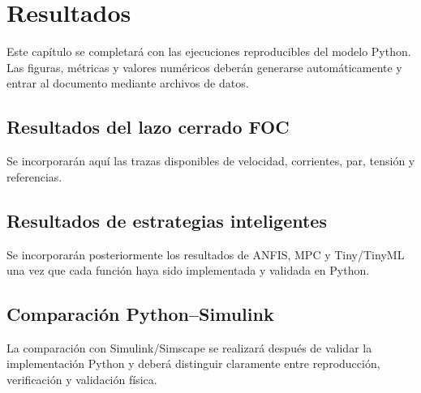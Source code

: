 \section{Resultados}

Este capítulo se completará con las ejecuciones reproducibles del modelo Python. Las figuras, métricas y valores numéricos deberán generarse automáticamente y entrar al documento mediante archivos de datos.

\subsection{Resultados del lazo cerrado FOC}
Se incorporarán aquí las trazas disponibles de velocidad, corrientes, par, tensión y referencias.

\subsection{Resultados de estrategias inteligentes}
Se incorporarán posteriormente los resultados de ANFIS, MPC y Tiny/TinyML una vez que cada función haya sido implementada y validada en Python.

\subsection{Comparación Python--Simulink}
La comparación con Simulink/Simscape se realizará después de validar la implementación Python y deberá distinguir claramente entre reproducción, verificación y validación física.
